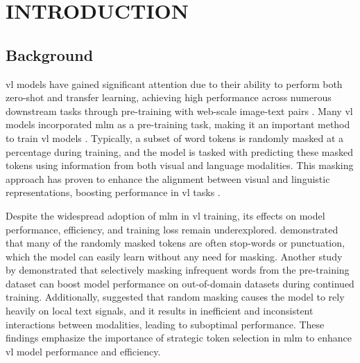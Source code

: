 \setlength{\parindent}{0in}
\setlength{\parskip}{1.5mm}
\setlength{\baselineskip}{1.6em}

\chapter{INTRODUCTION}
\section{Background}
\acrfull{vl} models have gained significant attention due to their ability to perform both zero-shot and transfer learning, achieving high performance across numerous downstream tasks through pre-training with web-scale image-text pairs \cite{s-clip, medclip, vl-review}.  
Many \acrshort{vl} models incorporated \acrfull{mlm} as a pre-training task, making it an important method to train \acrshort{vl} models \cite{albef, mplug, uniter, beit-3, lxmert}.  
Typically, a subset of word tokens is randomly masked at a percentage during training, and the model is tasked with predicting these masked tokens using information from both visual and language modalities.  
This masking approach has proven to enhance the alignment between visual and linguistic representations, boosting performance in \acrshort{vl} tasks \cite{lxmert}.  

Despite the widespread adoption of \acrshort{mlm} in \acrshort{vl} training, its effects on model performance, efficiency, and training loss remain underexplored.  
 demonstrated that many of the randomly masked tokens are often stop-words or punctuation, which the model can easily learn without any need for masking.  
Another study by  demonstrated that selectively masking infrequent words from the pre-training dataset can boost model performance on out-of-domain datasets during continued training.  
Additionally,  suggested that random masking causes the model to rely heavily on local text signals, and it results in inefficient and inconsistent interactions between modalities, leading to suboptimal performance.  
These findings emphasize the importance of strategic token selection in \acrshort{mlm} to enhance \acrshort{vl} model performance and efficiency.  


